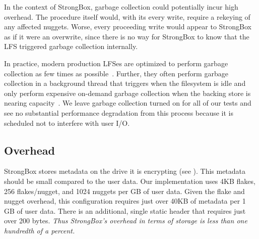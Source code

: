 In the context of StrongBox, garbage collection could potentially incur high
overhead. The procedure itself would, with its every write, require a rekeying
of any affected nuggets. Worse, every proceeding write would appear to StrongBox
as if it were an overwrite, since there is no way for StrongBox to know that the
LFS triggered garbage collection internally.

In practice, modern production LFSes are optimized to perform garbage collection
as few times as possible~\cite{F2FS}. Further, they often perform garbage
collection in a background thread that triggers when the filesystem is idle and
only perform expensive on-demand garbage collection when the backing store is
nearing capacity~\cite{F2FS, NILFS}. We leave garbage collection turned on for
all of our tests and see no substantial performance degradation from this
process because it is scheduled not to interfere with user I/O.

\subsection{Overhead}

StrongBox stores metadata on the drive it is encrypting (see
). This metadata should be small compared to the user data.
Our implementation uses 4KB flakes, 256 flakes/nugget, and 1024 nuggets per GB
of user data. Given the flake and nugget overhead, this configuration requires
just over 40KB of metadata per 1 GB of user data. There is an additional, single
static header that requires just over 200 bytes. \emph{Thus StrongBox's overhead
in terms of storage is less than one hundredth of a percent.}
